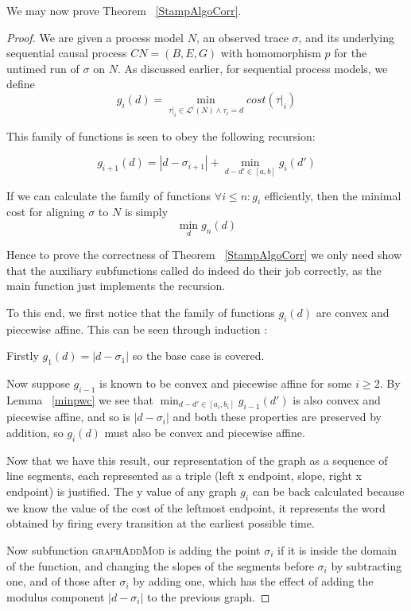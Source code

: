 \documentclass[conference]{IEEEtran}
\begin{document}
	We may now prove Theorem ~\ref{StampAlgoCorr}. 
	
		\begin{proof}
		We are given a process model $N$, an observed trace $\sigma$, and its underlying sequential causal process $CN = (B, E, G)$ with homomorphism $p$ for the untimed run of $\sigma$ on $N$.
		As discussed earlier, for sequential process models, we define $$g_i(d) = \min_{\tau|_i \in \mathcal{L}^i(N) \wedge \tau_i = d} cost(\tau|_i)$$
		
		This family of functions is seen to obey the following recursion: 
		
		$$g_{i+1}(d) = |d - \sigma_{i+1}| + \min_{d-d' \in [a,b]} g_i(d')$$
		
		If we can calculate the family of functions $\forall i \leq n : g_i$ efficiently, then the minimal cost for aligning $\sigma$ to $N$ is simply $$\min_{d} g_n(d)$$
		
		Hence to prove the correctness of Theorem ~\ref{StampAlgoCorr} we only need show that the auxiliary subfunctions called do indeed do their job correctly, as the main function just implements the recursion. 
		
		To this end, we first notice that the family of functions $g_i(d)$ are convex and piecewise affine. 
		This can be seen through induction : 
		
		Firstly $g_1(d) = |d - \sigma_1|$ so the base case is covered. 
		
		Now suppose $g_{i-1}$ is known to be convex and piecewise affine for some $i \geq 2$. 
		By Lemma ~\ref{minpwc} we see that $\min_{d-d' \in [a_i,b_i]} g_{i-1}(d')$  is also convex and piecewise affine, and so is $|d - \sigma_i|$ and both these properties are preserved by addition, so $g_i(d)$ must also be convex and piecewise affine. 
		
		Now that we have this result, our representation of the graph as a sequence of line segments, each represented as a triple (left x endpoint, slope, right x endpoint) is justified. 
		The y value of any graph $g_i$ can be back calculated because we know the value of the cost of the leftmost endpoint, it represents the word obtained by firing every transition at the earliest possible time. 
		
		Now subfunction \textsc{graphAddMod} is adding the point $\sigma_i$ if it is inside the domain of the function, and changing the slopes of the segments before $\sigma_i$ by subtracting one, and of those after $\sigma_i$ by adding one, which has the effect of adding the modulus component $|d - \sigma_i|$ to the previous graph. 
		

\end{proof}
\end{document}
